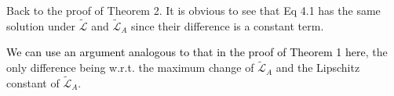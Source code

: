 \documentclass[conference]{IEEEtran}
\numberwithin{equation}{section}
\newcommand{\laks}[1]{\textcolor{black}{#1}}
\newtheorem{sampling strategy}{Sampling Strategy}
\begin{document}


Back to the proof of Theorem 2. It is obvious to see that Eq 4.1 
has the same solution under $\tilde{\mathcal{L}}$ and $\tilde{\mathcal{L}}_A$ since their difference is a constant term.

\laks{We can use an argument analogous to that in the proof of Theorem 1 here}, the only difference being w.r.t.  the maximum change of $\tilde{\mathcal{L}}_A$ and the Lipschitz constant of $\tilde{\mathcal{L}}_A$. 
\end{document}
